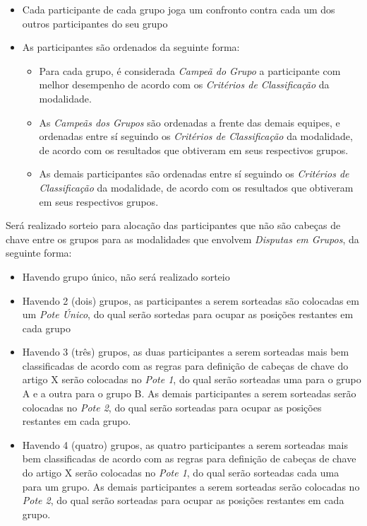 \begin{itemize}[noitemsep]
	\item Cada participante de cada grupo joga um confronto contra cada um dos outros participantes do seu grupo
	\item As participantes são ordenados da seguinte forma:
	\begin{itemize}[noitemsep]
		\item Para cada grupo, é considerada \textit{Campeã do Grupo} a participante com melhor desempenho de acordo com os \textit{Critérios de Classificação} da modalidade.
		\item As \textit{Campeãs dos Grupos} são ordenadas a frente das demais equipes, e ordenadas entre sí seguindo os \textit{Critérios de Classificação} da modalidade, de acordo com os resultados que obtiveram em seus respectivos grupos.
		\item As demais participantes são ordenadas entre sí seguindo os \textit{Critérios de Classificação} da modalidade, de acordo com os resultados que obtiveram em seus respectivos grupos.
	\end{itemize}
\end{itemize}

\noindent
\noindent
Será realizado sorteio para alocação das participantes que não são cabeças de chave entre os grupos para as modalidades que envolvem \textit{Disputas em Grupos}, da seguinte forma:
\begin{itemize}[noitemsep]
	\item Havendo grupo único, não será realizado sorteio
	\item Havendo 2 (dois) grupos, as participantes a serem sorteadas são colocadas em um \textit{Pote Único}, do qual serão sortedas para ocupar as posições restantes em cada grupo
	\item Havendo 3 (três) grupos, as duas participantes a serem sorteadas mais bem classificadas de acordo com as regras para definição de cabeças de chave do artigo X serão colocadas no \textit{Pote 1}, do qual serão sorteadas uma para o grupo A e a outra para o grupo B. As demais participantes a serem sorteadas serão colocadas no \textit{Pote 2}, do qual serão sorteadas para ocupar as posições restantes em cada grupo.
	\item Havendo 4 (quatro) grupos, as quatro participantes a serem sorteadas mais bem classificadas de acordo com as regras para definição de cabeças de chave do artigo X serão colocadas no \textit{Pote 1}, do qual serão sorteadas cada uma para um grupo. As demais participantes a serem sorteadas serão colocadas no \textit{Pote 2}, do qual serão sorteadas para ocupar as posições restantes em cada grupo.
\end{itemize}

